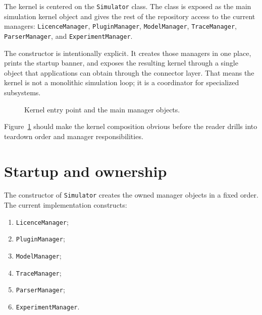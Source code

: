 The kernel is centered on the \texttt{Simulator} class. The class is exposed as
the main simulation kernel object and gives the rest of the repository access
to the current managers:
\texttt{LicenceManager},
\texttt{PluginManager},
\texttt{ModelManager},
\texttt{TraceManager},
\texttt{ParserManager}, and
\texttt{ExperimentManager}.

The constructor is intentionally explicit. It creates those managers in one
place, prints the startup banner, and exposes the resulting kernel through a
single object that applications can obtain through the connector layer. That
means the kernel is not a monolithic simulation loop; it is a coordinator for
specialized subsystems.

\begin{figure}[htbp]
\centering
\caption{Kernel entry point and the main manager objects.}
\label{fig:kernel-uml}
\end{figure}

Figure~\ref{fig:kernel-uml} should make the kernel composition obvious before
the reader drills into teardown order and manager responsibilities.

\section{Startup and ownership}
\label{sec:kernel-startup-ownership}

The constructor of \texttt{Simulator} creates the owned manager objects in a
fixed order. The current implementation constructs:
\begin{enumerate}
\item \texttt{LicenceManager};
\item \texttt{PluginManager};
\item \texttt{ModelManager};
\item \texttt{TraceManager};
\item \texttt{ParserManager};
\item \texttt{ExperimentManager}.
\end{enumerate}

